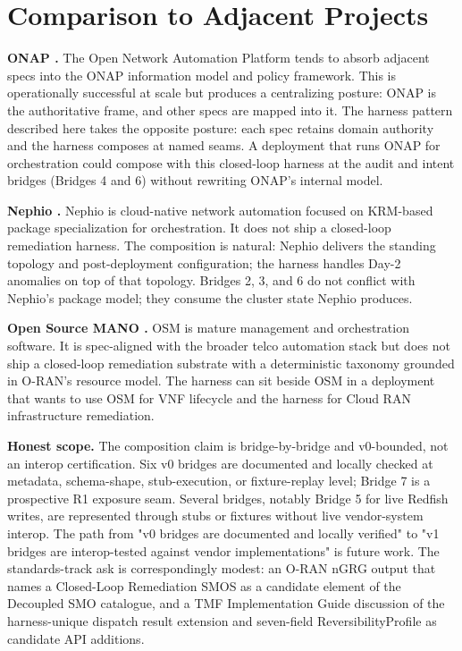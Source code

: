 \documentclass[twocolumn,10pt,a4paper]{article}
\begin{document}
\section{Comparison to Adjacent Projects}
\label{sec:compare}

\textbf{ONAP \cite{onap}.} The Open Network Automation Platform tends to absorb adjacent specs into the ONAP information model and policy framework. This is operationally successful at scale but produces a centralizing posture: ONAP is the authoritative frame, and other specs are mapped into it. The harness pattern described here takes the opposite posture: each spec retains domain authority and the harness composes at named seams. A deployment that runs ONAP for orchestration could compose with this closed-loop harness at the audit and intent bridges (Bridges 4 and 6) without rewriting ONAP's internal model.

\textbf{Nephio \cite{nephio}.} Nephio is cloud-native network automation focused on KRM-based package specialization for orchestration. It does not ship a closed-loop remediation harness. The composition is natural: Nephio delivers the standing topology and post-deployment configuration; the harness handles Day-2 anomalies on top of that topology. Bridges 2, 3, and 6 do not conflict with Nephio's package model; they consume the cluster state Nephio produces.

\textbf{Open Source MANO \cite{osm}.} OSM is mature management and orchestration software. It is spec-aligned with the broader telco automation stack but does not ship a closed-loop remediation substrate with a deterministic taxonomy grounded in O-RAN's resource model. The harness can sit beside OSM in a deployment that wants to use OSM for VNF lifecycle and the harness for Cloud RAN infrastructure remediation.

\textbf{Honest scope.} The composition claim is bridge-by-bridge and v0-bounded, not an interop certification. Six v0 bridges are documented and locally checked at metadata, schema-shape, stub-execution, or fixture-replay level; Bridge 7 is a prospective R1 exposure seam. Several bridges, notably Bridge 5 for live Redfish writes, are represented through stubs or fixtures without live vendor-system interop. The path from "v0 bridges are documented and locally verified" to "v1 bridges are interop-tested against vendor implementations" is future work. The standards-track ask is correspondingly modest: an O-RAN nGRG output that names a Closed-Loop Remediation SMOS as a candidate element of the Decoupled SMO catalogue, and a TMF Implementation Guide discussion of the harness-unique dispatch result extension and seven-field ReversibilityProfile as candidate API additions.
\end{document}
